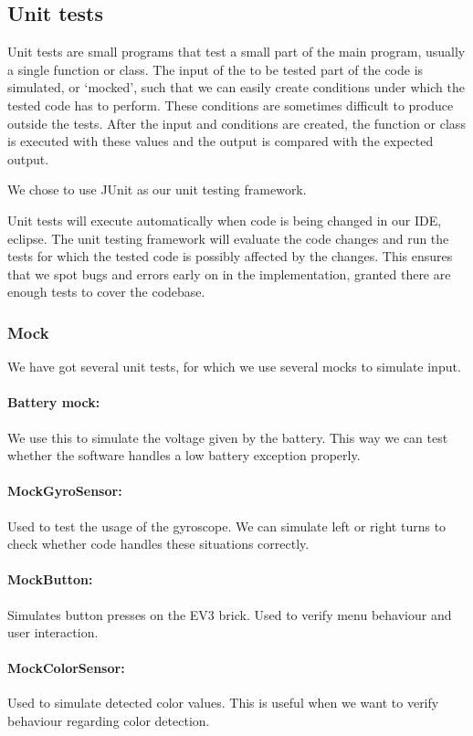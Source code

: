 \documentclass[a4paper,oneside,11pt]{article}
\begin{document}
\subsection{Unit tests}
Unit tests are small programs that test a small part of the main program, usually a single function or class. The input of the to be tested part of the code is simulated, or ‘mocked’, such that we can easily create conditions under which the tested code has to perform. These conditions are sometimes difficult to produce outside the tests. After the input and conditions are created, the function or class is executed with these values and the output is compared with the expected output.

We chose to use JUnit as our unit testing framework. 

Unit tests will execute automatically when code is being changed in our IDE, eclipse. The unit testing framework will evaluate the code changes and run the tests for which the tested code is possibly affected by the changes. This ensures that we spot bugs and errors early on in the implementation, granted there are enough tests to cover the codebase.

\subsubsection{Mock}
We have got several unit tests, for which we use several mocks to simulate input.

\paragraph{Battery mock:} We use this to simulate the voltage given by the battery. This way we can test whether the software handles a low battery exception properly.

\paragraph{MockGyroSensor:} Used to test the usage of the gyroscope. We can simulate left or right turns to check whether code handles these situations correctly.

\paragraph{MockButton:} Simulates button presses on the EV3 brick. Used to verify menu behaviour and user interaction.

\paragraph{MockColorSensor:} Used to simulate detected color values. This is useful when we want to verify behaviour regarding color detection. 
\end{document}

